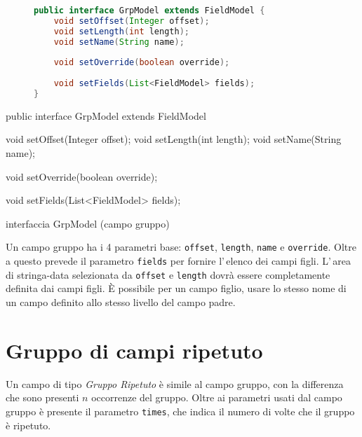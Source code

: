 \ifesource
\begin{figure*}[!htb]
\begin{lstlisting}[language=java, 
caption=interfaccia GrpModel (campo gruppo), 
label=lst:GrpModel]
public interface GrpModel extends FieldModel {
    void setOffset(Integer offset);
    void setLength(int length);
    void setName(String name);
    
    void setOverride(boolean override);
    
    void setFields(List<FieldModel> fields);
}
\end{lstlisting}
\end{figure*}
\else
\begin{elisting}[!htb]
\begin{javacode}
public interface GrpModel extends FieldModel {
    void setOffset(Integer offset);
    void setLength(int length);
    void setName(String name);
    
    void setOverride(boolean override);
    
    void setFields(List<FieldModel> fields);
}
\end{javacode}
\caption{interfaccia GrpModel (campo gruppo)}
\label{lst:GrpModel}
\end{elisting}
\fi

Un campo gruppo ha i 4 parametri base: \verb!offset!, \verb!length!, 
\verb!name! e \verb!override!.
Oltre a questo prevede il parametro \verb!fields! per fornire l'\,elenco dei 
campi figli.
L'\,area di stringa-data selezionata da \verb!offset! e \verb!length! dovrà
essere completamente definita dai campi figli.
È possibile per un campo figlio, usare lo stesso nome di un campo definito
allo stesso livello del campo padre. 

\section{Gruppo di campi ripetuto}
Un campo di tipo \textsl{Gruppo Ripetuto} è simile al campo gruppo, con la 
differenza che sono presenti $n$ occorrenze del gruppo.
Oltre ai parametri usati dal campo gruppo è presente il parametro \verb!times!,
che indica il numero di volte che il gruppo è ripetuto.

